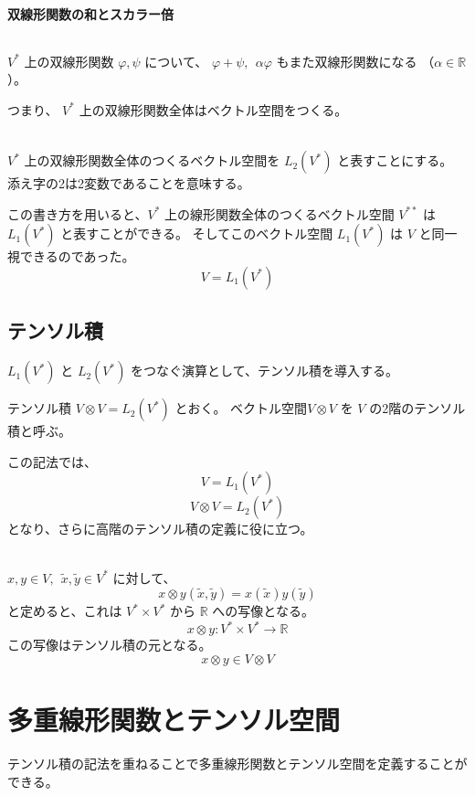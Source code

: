 \documentclass[uplatex,a4j,12pt,dvipdfmx]{jsarticle}
\begin{document}
\paragraph{双線形関数の和とスカラー倍}

${}$

$V^{*}$ 上の双線形関数 $\varphi, \psi$ について、
$\varphi + \psi, \ \ \alpha \varphi$ もまた双線形関数になる
（$\alpha \in \mathbb{R}$）。

つまり、 $V^{*}$ 上の双線形関数全体はベクトル空間をつくる。

\ \\

$V^{*}$ 上の双線形関数全体のつくるベクトル空間を $L_{2}(V^{*})$ と表すことにする。
添え字の2は2変数であることを意味する。

この書き方を用いると、$V^{*}$ 上の線形関数全体のつくるベクトル空間 $V^{**}$ は
$L_{1}(V^{*})$ と表すことができる。
そしてこのベクトル空間 $L_{1}(V^{*})$ は $V$ と同一視できるのであった。
$$
	V = L_{1}(V^{*})
$$

\subsection{テンソル積}

$L_{1}(V^{*})$ と $L_{2}(V^{*})$ をつなぐ演算として、テンソル積を導入する。

\begin{itembox}[l]{テンソル積}
	$V \otimes V = L_{2}(V^{*})$ とおく。
	ベクトル空間$V \otimes V$ を $V$ の2階のテンソル積と呼ぶ。
\end{itembox}

この記法では、
$$V = L_{1}(V^{*})$$
$$V \otimes V = L_{2}(V^{*})$$
となり、さらに高階のテンソル積の定義に役に立つ。

\ \\

$x,y \in V, \ \ \tilde{x}, \tilde{y} \in V^{*}$ に対して、
$$
	x \otimes y(\tilde{x}, \tilde{y}) = x(\tilde{x}) y(\tilde{y})
$$
と定めると、これは
$V^{*} \times V^{*}$
から
$\mathbb{R}$ への写像となる。
$$
	x \otimes y : V^{*} \times V^{*} \to \mathbb{R}
$$
この写像はテンソル積の元となる。
$$
	x \otimes y \in V \otimes V
$$

\section{多重線形関数とテンソル空間}

テンソル積の記法を重ねることで多重線形関数とテンソル空間を定義することができる。
\end{document}
